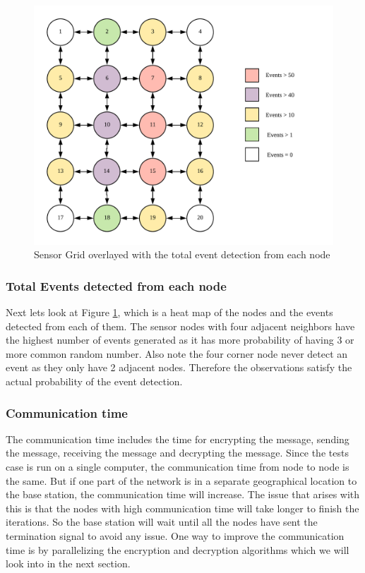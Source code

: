 \documentclass[conference]{IEEEtran}
\begin{document}
	 \begin{figure}[!h]
	 	\centering
	 	\includegraphics[width=3.in,keepaspectratio]{gridsum}
	 	\caption{Sensor Grid overlayed with the total event detection from each node}
	 	\label{colgrid}
	 \end{figure}
 
	\subsubsection{Total Events detected from each node}
	Next lets look at Figure \ref{colgrid}, which is a heat map of the nodes and the events detected from each of them. The sensor nodes with four adjacent neighbors have the highest number of events generated as it has more probability of having 3 or more common random number. Also note the four corner node never 
	detect an event as they only have 2 adjacent nodes. Therefore the observations satisfy the actual probability of the event detection.
	
	\subsubsection{Communication time}
	
	The communication time includes the time for encrypting the message, sending the message, receiving the message and decrypting the message. Since the tests case is run on a single computer, the communication time from node to node is the same. But if one part of the network is in a separate geographical location to the base station, the communication time will increase. The issue that arises with this is that the nodes with high communication time will take longer to finish the iterations. So the base station will wait until all the nodes have sent the termination signal to avoid any issue. One way to improve the communication time is by parallelizing the encryption and decryption algorithms which we will look into in the next section.
\end{document}
